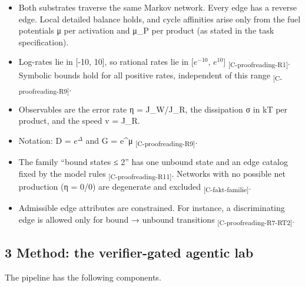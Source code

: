\documentclass[
  english,
  twocolumn,
  10pt]{article}
\providecommand{\tightlist}{%
  \setlength{\itemsep}{0pt}\setlength{\parskip}{0pt}}
\begin{document}
\begin{itemize}
\tightlist
\item
  Both substrates traverse the same Markov network. Every edge has a
  reverse edge. Local detailed balance holds, and cycle affinities arise
  only from the fuel potentials μ per activation and μ\_P per product
  (as stated in the task specification).
\item
  Log-rates lie in {[}-10, 10{]}, so rational rates lie in
  {[}\(e^{-10}\), \(e^{10}\){]} \textsubscript{[C-proofreading-R1]}.
  Symbolic bounds hold for all positive rates, independent of this range
  \textsubscript{[C-proofreading-R9]}.
\item
  Observables are the error rate η = J\_W/J\_R, the dissipation σ in kT
  per product, and the speed v = J\_R.
\item
  Notation: D = \(e^{\Delta}\) and G = e\^{}μ
  \textsubscript{[C-proofreading-R9]}.
\item
  The family ``bound states ≤ 2'' has one unbound state and an edge
  catalog fixed by the model rules \textsubscript{[C-proofreading-R11]}.
  Networks with no possible net production (η = 0/0) are degenerate and
  excluded \textsubscript{[C-fakt-familie]}.
\item
  Admissible edge attributes are constrained. For instance, a
  discriminating edge is allowed only for bound → unbound transitions
  \textsubscript{[C-proofreading-R7-RT2]}.
\end{itemize}

\subsection{3 Method: the verifier-gated agentic
lab}\label{method-the-verifier-gated-agentic-lab}

The pipeline has the following components.
\end{document}
